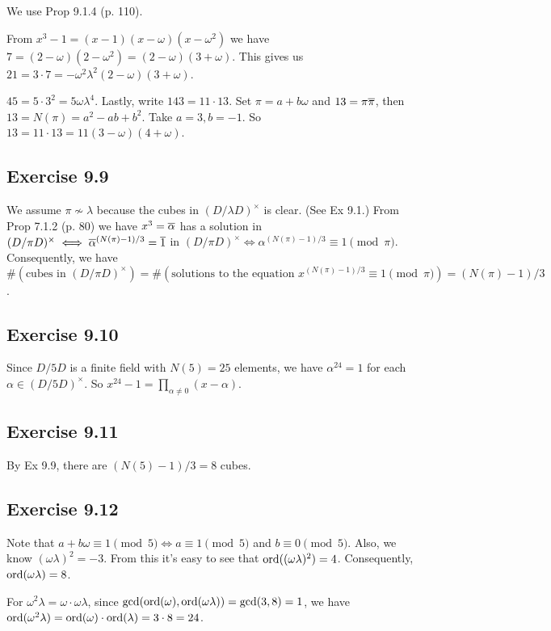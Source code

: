 \documentclass[../I&R.tex]{subfiles}
\begin{document}
We use Prop 9.1.4 (p. 110).

From $x^3-1=(x-1)(x-\omega)(x-\omega^2)$ we have $7=(2-\omega)(2-\omega^2)=(2-\omega)(3+\omega)$. This gives us $21=3\cdot7=-\omega^2\lambda^2(2-\omega)(3+\omega)$.

$45=5\cdot3^2=5\omega\lambda^4$. Lastly, write $143=11\cdot13$. Set $\pi=a+b\omega$ and $13=\pi\overline{\pi}$, then $13=N(\pi)=a^2-ab+b^2$. Take $a=3,b=-1$. So $13=11\cdot13=11(3-\omega)(4+\omega)$.

\subsection*{Exercise 9.9}

We assume $\pi\not\sim\lambda$ because the cubes in $(D/\lambda D)^\times$ is clear. (See Ex 9.1.) From Prop 7.1.2 (p. 80) we have $x^3=\overline{\alpha}$ has a solution in $(D/\pi D)^\times \iff \overline{\alpha}^{(N(\pi)-1)/3}=\overline{1}$ in $(D/\pi D)^\times \iff \alpha^{(N(\pi)-1)/3}\equiv1\pmod{\pi}$. Consequently, we have $\#(\text{cubes in }(D/\pi D)^\times)=\#(\text{solutions to the equation } x^{(N(\pi)-1)/3}\equiv1\pmod{\pi})=(N(\pi)-1)/3$.

\subsection*{Exercise 9.10}

Since $D/5D$ is a finite field with $N(5)=25$ elements, we have $\alpha^{24}=1$ for each $\alpha\in(D/5D)^\times$. So $x^{24}-1=\prod_{\alpha\neq0} (x-\alpha)$.

\subsection*{Exercise 9.11}

By Ex 9.9, there are $(N(5)-1)/3=8$ cubes.

\subsection*{Exercise 9.12}

Note that $a+b\omega\equiv1\pmod{5} \iff a\equiv1\pmod{5}$ and $b\equiv0\pmod{5}$. Also, we know $(\omega\lambda)^2=-3$. From this it's easy to see that $\operatorname{ord}((\omega\lambda)^2)=4$. Consequently, $\operatorname{ord}(\omega\lambda)=8$.

For $\omega^2\lambda=\omega\cdot\omega\lambda$, since $\gcd(\operatorname{ord}(\omega),\operatorname{ord}(\omega\lambda))=\gcd(3,8)=1$, we have $\operatorname{ord}(\omega^2\lambda)=\operatorname{ord}(\omega)\cdot\operatorname{ord}(\lambda)=3\cdot8=24$.
\end{document}
